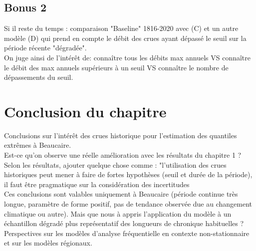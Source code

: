 \documentclass[11pt]{article}
\begin{document}
	\subsection{Bonus 2}
	Si il reste du temps : comparaison "Baseline" 1816-2020 avec (C) et un autre modèle (D) qui prend en compte le débit des crues ayant dépassé le seuil sur la période récente "dégradée".\\
	On juge ainsi de l'intérêt de: connaître tous les débits max annuels VS connaître le débit des max annuels supérieurs à un seuil VS connaître le nombre de dépassements du seuil.
	
\section{Conclusion du chapitre}
	Conclusions sur l'intérêt des crues historique pour l'estimation des quantiles extrêmes à Beaucaire. \\
	Est-ce qu'on observe une réelle amélioration avec les résultats du chapitre 1 ?\\
	Selon les résultats, ajouter quelque chose comme : "l'utilisation des crues historiques peut mener à faire de fortes hypothèses (seuil et durée de la période), il faut être pragmatique sur la considération des incertitudes\\
	Ces conclusions sont valables uniquement à Beaucaire (période continue très longue, paramètre de forme positif, pas de tendance observée due au changement climatique ou autre). Mais que nous à appris l'application du modèle à un échantillon dégradé plus représentatif des longueurs de chronique habituelles ?\\
	Perspectives sur les modèles d'analyse fréquentielle en contexte non-stationnaire et sur les modèles régionaux.  

\printbibliography
\end{document}
